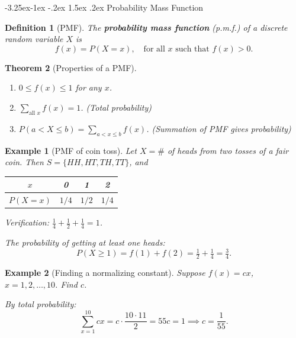 \documentclass{article}
\makeatletter
\newtheorem{theorem}{Theorem}[section]
\newtheorem{definition}[theorem]{Definition}
\newtheorem{example}{Example}[section]
\theoremstyle{remark}
\newlength{\subsecindent}
\renewcommand\subsection{\@startsection{subsection}{2}{\subsecindent}%
  {-3.25ex\@plus -1ex \@minus -.2ex}%
  {1.5ex \@plus .2ex}%
  {\normalfont\large\bfseries}}
\newenvironment{sub}{%
  \begin{list}{}{%
    \setlength{\leftmargin}{4em}%
    \setlength{\rightmargin}{0pt}%
    \setlength{\topsep}{0pt}%
    \setlength{\partopsep}{0pt}%
    \setlength{\parsep}{\parskip}%
    \setlength{\itemsep}{\parskip}%
  }\item\relax
}{\end{list}}
\makeatother
\begin{document}
\subsection{Probability Mass Function}
\begin{sub}

\begin{definition}[PMF]
  \label{def:pmf}
  The \textbf{probability mass function} (p.m.f.) of a discrete random
  variable $X$ is
  \begin{equation}
    f(x) = P(X = x), \quad \text{for all } x \text{ such that } f(x) > 0.
    \label{eq:pmf}
  \end{equation}
\end{definition}

\begin{theorem}[Properties of a PMF]
  \label{thm:pmf-prop}
  \begin{enumerate}
    \item $0 \le f(x) \le 1$ for any $x$.
    \item $\displaystyle\sum_{\text{all } x} f(x) = 1$. \quad (Total probability)
    \item $\displaystyle P(a < X \le b) = \sum_{a < x \le b} f(x)$. \quad (Summation of PMF gives probability)
  \end{enumerate}
\end{theorem}

\begin{example}[PMF of coin toss]
  \label{ex:pmf-coin}
  Let $X = \#$ of heads from two tosses of a fair coin. Then $S = \{HH, HT, TH, TT\}$, and
  \begin{center}
    \begin{tabular}{c|ccc}
      $x$ & 0 & 1 & 2 \\ \hline
      $P(X = x)$ & $1/4$ & $1/2$ & $1/4$
    \end{tabular}
  \end{center}
  Verification: $\frac{1}{4} + \frac{1}{2} + \frac{1}{4} = 1$. \checkmark

  The probability of getting at least one heads:
  \[
    P(X \ge 1) = f(1) + f(2) = \tfrac{1}{2} + \tfrac{1}{4} = \tfrac{3}{4}.
  \]
\end{example}

\begin{example}[Finding a normalizing constant]
  \label{ex:find-c}
  Suppose $f(x) = cx$, $x = 1, 2, \ldots, 10$. Find $c$.

  By total probability:
  \[
    \sum_{x=1}^{10} cx = c \cdot \frac{10 \cdot 11}{2} = 55c = 1
    \implies c = \frac{1}{55}.
  \]
\end{example}

\end{sub}
\end{document}
